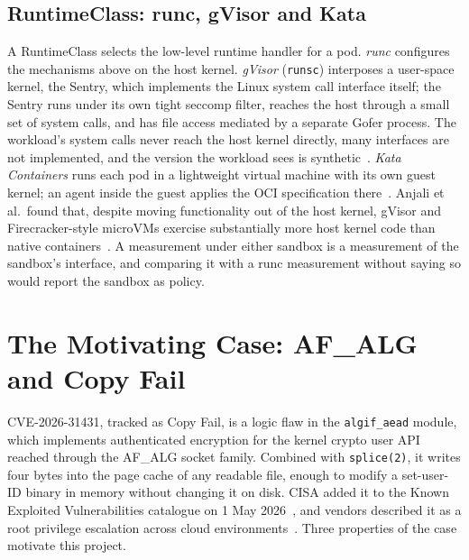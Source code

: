 \subsection{RuntimeClass: runc, gVisor and Kata}
A RuntimeClass selects the low-level runtime handler for a pod. \emph{runc} configures the mechanisms above on the host kernel. \emph{gVisor} (\texttt{runsc}) interposes a user-space kernel, the Sentry, which implements the Linux system call interface itself; the Sentry runs under its own tight seccomp filter, reaches the host through a small set of system calls, and has file access mediated by a separate Gofer process. The workload's system calls never reach the host kernel directly, many interfaces are not implemented, and the version the workload sees is synthetic~\cite{young2019gvisor,gvisor}. \emph{Kata Containers} runs each pod in a lightweight virtual machine with its own guest kernel; an agent inside the guest applies the OCI specification there~\cite{kata}. Anjali et al.\ found that, despite moving functionality out of the host kernel, gVisor and Firecracker-style microVMs exercise substantially more host kernel code than native containers~\cite{anjali2020blending}. A measurement under either sandbox is a measurement of the sandbox's interface, and comparing it with a runc measurement without saying so would report the sandbox as policy.

\section{The Motivating Case: AF\_ALG and Copy Fail}

CVE-2026-31431, tracked as Copy Fail, is a logic flaw in the \texttt{algif\_aead} module, which implements authenticated encryption for the kernel crypto user API reached through the AF\_ALG socket family. Combined with \texttt{splice(2)}, it writes four bytes into the page cache of any readable file, enough to modify a set-user-ID binary in memory without changing it on disk. CISA added it to the Known Exploited Vulnerabilities catalogue on 1 May 2026~\cite{cve-2026-31431,kev}, and vendors described it as a root privilege escalation across cloud environments~\cite{msblog,sysdig}. Three properties of the case motivate this project.

